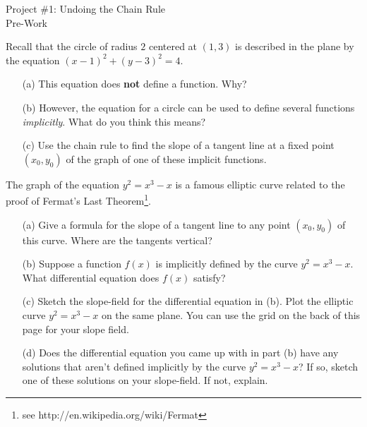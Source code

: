 \documentclass[epsf]{article}
\begin{document}
\newcommand{\R}{\mathbb{R}}
\newcommand{\noi}{\noindent}
\newcommand{\bs}{\bigskip}



\begin{center}
{\Large Project \#1: Undoing the Chain Rule\\
\vskip 2mm
Pre-Work}
\end{center}


\noi{\bf PW 1}  Recall that the circle of radius $2$ centered at $(1,3)$
is described in the plane by the equation
$(x-1)^2+(y-3)^2=4.$
\begin{itemize}
\item[(a)]  This equation does {\bf not} define a function.  Why?

\item[(b)]  However, the equation for a circle can be used to define several functions {\em implicitly}.  What do you think this means?

\item[(c)] Use the chain rule to find the slope of a tangent line at a fixed point $(x_0, y_0)$ of the graph of
one of these implicit functions.  \\
\end{itemize}

\noi{\bf PW 2} The graph of the equation $y^2=x^3-x$ is a famous elliptic curve related to the proof of Fermat's Last Theorem\footnote{see http://en.wikipedia.org/wiki/Fermat}. 

\begin{itemize}
\item[(a)] Give a formula for the slope of a tangent line to any point $(x_0, y_0)$ of this curve.  Where are the tangents vertical?

\item[(b)] Suppose a function $f(x)$ is implicitly defined by the curve $y^2=x^3-x$.  What differential equation
does $f(x)$ satisfy? 

\item[(c)] Sketch the slope-field for the differential equation in (b). Plot the elliptic curve
$y^2=x^3-x$ on the same plane.  You can use the grid on the back of this page for your slope field.

\item[(d)] Does the differential equation you came up with in part (b) have any solutions that aren't defined implicitly by the curve $y^2=x^3-x$?  If so, sketch one of these solutions on your slope-field.  If not, explain.
\end{itemize}
\end{document}
